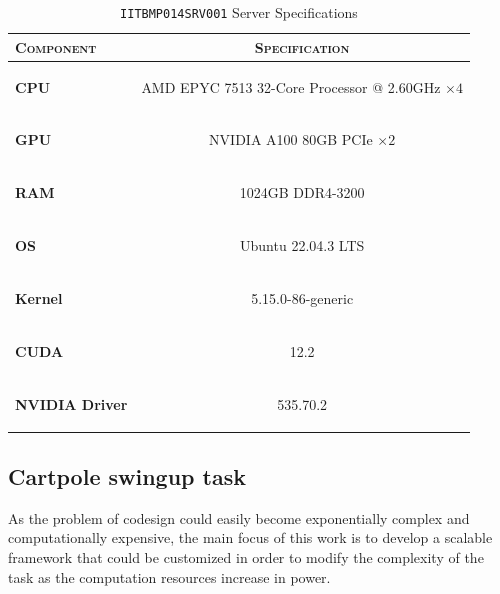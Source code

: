 \begin{table}[h]
    \centering
    \label{tab:rl_machine}
    \caption{\texttt{IITBMP014SRV001} Server Specifications}
    \begin{tabular}[h]{l c}
        \toprule
        \textsc{Component}     & \textsc{Specification}                                                       \\
        \midrule
        \textbf{CPU}           & \begin{small}AMD EPYC 7513 32-Core Processor @ 2.60GHz $\times 4$\end{small} \\
        \textbf{GPU}           & \begin{small}NVIDIA A100 80GB PCIe       $\times 2$             \end{small}  \\
        \textbf{RAM}           & \begin{small}1024GB DDR4-3200                         \end{small}            \\
        \textbf{OS}            & \begin{small}Ubuntu 22.04.3 LTS                       \end{small}            \\
        \textbf{Kernel}        & \begin{small}5.15.0-86-generic                        \end{small}            \\
        \textbf{CUDA}          & \begin{small}12.2                                  \end{small}               \\
        \textbf{NVIDIA Driver} & \begin{small}535.70.2                             \end{small}                \\
        \bottomrule
    \end{tabular}
\end{table}

\subsection{Cartpole swingup task}

As the problem of codesign could easily become exponentially complex and computationally expensive, the main focus of this work is to develop a scalable framework that could be customized in order to modify the complexity of the task as the computation resources increase in power.

